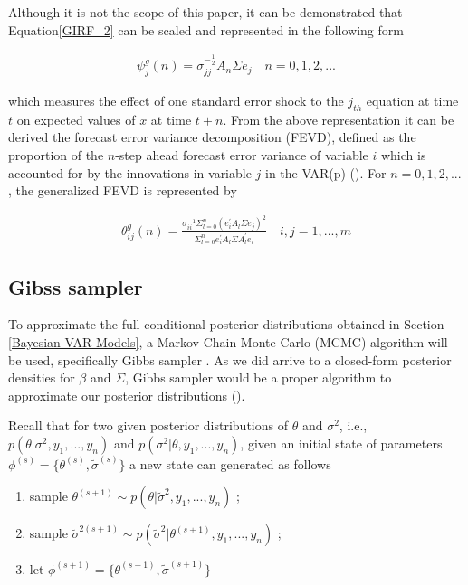 \documentclass[12pt]{article}
\begin{document}
Although it is not the scope of this paper, it can be demonstrated that Equation\ref{GIRF_2} can be scaled and represented in the following form

\begin{equation}\label{GIRF_2}
\begin{split}
\psi_{j}^{g}(n) = \sigma_{jj}^{-\frac{1}{2}}A_{n}\Sigma e_{j} \quad n=0,1,2,...
\end{split}
\end{equation}

which measures the effect of one standard error shock to the $j_{th}$ equation at time $t$ on expected values of $x$ at time $t+n$. From the above representation it can be derived the forecast error variance  decomposition (FEVD), defined as the proportion of the $n$-step ahead forecast error variance  of variable $i$ which is accounted for by the innovations in variable $j$ in the VAR(p) (\cite{pesaran1998generalized}). For $n=0,1,2,...$, the generalized FEVD is represented by

\begin{equation}\label{GIRF_2}
\begin{split}
\theta_{ij}^{g}(n)=\frac{\sigma_{ii}^{-1}\Sigma_{l=0}^{n}(e_{i}^{'}A_{l}\Sigma e_{j})^{2}}{\Sigma_{l=0}^{n}e^{'}_{i}A_{l}\Sigma A_{l}^{'}e_{i}} \quad i,j=1,...,m
\end{split}
\end{equation}


\subsection{Gibss sampler}

To approximate the full conditional posterior distributions obtained in Section \ref{Bayesian VAR Models}, a Markov-Chain Monte-Carlo (MCMC) algorithm will be used, specifically Gibbs sampler . As we did arrive to a closed-form  posterior densities for $\beta$ and $\Sigma$, Gibbs sampler would be a proper algorithm to approximate our posterior distributions (\cite{hoff2009first}). 

Recall that for two given posterior distributions of $\theta$ and $\sigma^{2}$, i.e., $p(\theta|\sigma^{2},y_{1},...,y_{n})$ and $p(\sigma^{2}|\theta, y_{1},...,y_{n})$, given an initial state of parameters $\phi^{(s)}=\{\theta^{(s)}, \tilde{\sigma}^{(s)}\}$ a new state can generated as follows

\begin{enumerate}
  \item sample $\theta^{(s+1)} \sim p(\theta|\tilde{\sigma}^{2},y_{1},...,y_{n})$ ;
  \item sample $\tilde{\sigma}^{2(s+1)} \sim p(\tilde{\sigma}^{2}|\theta^{(s+1)}, y_{1},...,y_{n})$ ;
  \item let $\phi^{(s+1)} =\{\theta^{(s+1)}, \tilde{\sigma}^{(s+1)}\}$
\end{enumerate}
\end{document}
